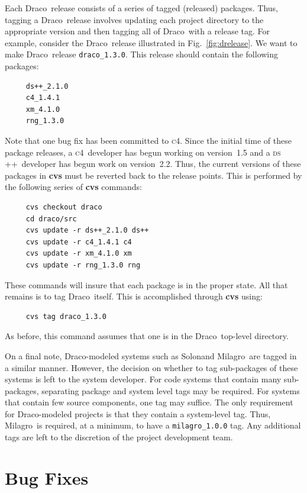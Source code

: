 \documentclass[11pt]{nmemo}
\newcommand{\draco}{{\normalfont\normalsize\textsf Draco}}
\newcommand{\milagro}{{\normalfont\normalsize\textsf Milagro}}
\newcommand{\solon}{{\normalfont\normalsize\textsf Solon}}
\newcommand{\cfour}{{\normalfont\normalsize\scshape c\small 4}}
\newcommand{\dsxx}{{\normalfont\normalsize\scshape ds\raisebox{.2ex}
  {\scriptsize ++}}}
\begin{document}
Each \draco\ release consists of a series of tagged (released)
packages.  Thus, tagging a \draco\ release involves updating each
project directory to the appropriate version and then tagging all of
\draco\ with a release tag.  For example, consider the \draco\ release 
illustrated in Fig.~\ref{fig:drelease}.  We want to make \draco\
release \texttt{draco\_1.3.0}.  This release should contain the
following packages:
\begin{verbatim}
     ds++_2.1.0
     c4_1.4.1
     xm_4.1.0
     rng_1.3.0
\end{verbatim}
Note that one bug fix has been committed to \cfour.  Since the initial
time of these package releases, a \cfour\ developer has begun working
on version~1.5 and a \dsxx\ developer has begun work on version~2.2.
Thus, the current versions of these packages in {\bf cvs} must be
reverted back to the release points. This is performed by the
following series of {\bf cvs} commands:
\begin{verbatim}
     cvs checkout draco
     cd draco/src
     cvs update -r ds++_2.1.0 ds++
     cvs update -r c4_1.4.1 c4
     cvs update -r xm_4.1.0 xm
     cvs update -r rng_1.3.0 rng
\end{verbatim}
These commands will insure that each package is in the proper state.
All that remains is to tag \draco\ itself.  This is accomplished
through {\bf cvs} using:
\begin{verbatim}
     cvs tag draco_1.3.0
\end{verbatim}
As before, this command assumes that one is in the \draco\ top-level
directory.  

On a final note, \draco-modeled systems such as \solon and \milagro\
are tagged in a similar manner.  However, the decision on whether to
tag sub-packages of these systems is left to the system developer.
For code systems that contain many sub-packages, separating package
and system level tags may be required.  For systems that contain few
source components, one tag may suffice.  The only requirement for
\draco-modeled projects is that they contain a system-level tag.
Thus, \milagro\ is required, at a minimum, to have a
\texttt{milagro\_1.0.0} tag.  Any additional tags are left to the
discretion of the project development team.


\section{Bug Fixes}
\end{document}
